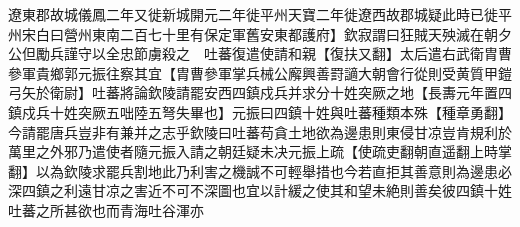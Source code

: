 遼東郡故城儀鳳二年又徙新城開元二年徙平州天寶二年徙遼西故郡城疑此時已徙平州宋白曰營州東南二百七十里有保定軍舊安東都護府】欽寂謂曰狂賊天殃滅在朝夕公但勵兵謹守以全忠節虜殺之　吐蕃復遣使請和親【復扶又翻】太后遣右武衛胄曹參軍貴鄉郭元振往察其宜【胄曹參軍掌兵械公廨興善罸讁大朝會行從則受黄質甲鎧弓矢於衛尉】吐蕃將論欽陵請罷安西四鎮戍兵并求分十姓突厥之地【長夀元年置四鎮戍兵十姓突厥五咄陸五弩失畢也】元振曰四鎮十姓與吐蕃種類本殊【種章勇翻】今請罷唐兵豈非有兼并之志乎欽陵曰吐蕃苟貪土地欲為邊患則東侵甘凉豈肯規利於萬里之外邪乃遣使者隨元振入請之朝廷疑未决元振上疏【使疏吏翻朝直遥翻上時掌翻】以為欽陵求罷兵割地此乃利害之機誠不可輕舉措也今若直拒其善意則為邊患必深四鎮之利遠甘凉之害近不可不深圖也宜以計緩之使其和望未絶則善矣彼四鎮十姓吐蕃之所甚欲也而青海吐谷渾亦
